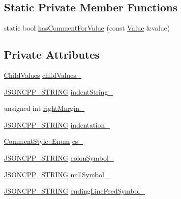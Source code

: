 \subsection*{Static Private Member Functions}
\begin{DoxyCompactItemize}
\item 
static bool \hyperlink{struct_json_1_1_built_styled_stream_writer_a457c2f3c1e8c952caeb60e52477d0c9a}{has\+Comment\+For\+Value} (const \hyperlink{class_json_1_1_value}{Value} \&value)
\end{DoxyCompactItemize}
\subsection*{Private Attributes}
\begin{DoxyCompactItemize}
\item 
\hyperlink{struct_json_1_1_built_styled_stream_writer_a63196b38400e5ce452f65ce856d47b6f}{Child\+Values} \hyperlink{struct_json_1_1_built_styled_stream_writer_a47d562d7874c5b1e68995bd62f575792}{child\+Values\+\_\+}
\item 
\hyperlink{config_8h_a1e723f95759de062585bc4a8fd3fa4be}{J\+S\+O\+N\+C\+P\+P\+\_\+\+S\+T\+R\+I\+NG} \hyperlink{struct_json_1_1_built_styled_stream_writer_a0f8115a4fb474ab0e9de25f10e5ca09a}{indent\+String\+\_\+}
\item 
unsigned int \hyperlink{struct_json_1_1_built_styled_stream_writer_a06a51521ccae20397f52fe3036edc602}{right\+Margin\+\_\+}
\item 
\hyperlink{config_8h_a1e723f95759de062585bc4a8fd3fa4be}{J\+S\+O\+N\+C\+P\+P\+\_\+\+S\+T\+R\+I\+NG} \hyperlink{struct_json_1_1_built_styled_stream_writer_aaa4cbad91428ceca37cbabfc2a17a92d}{indentation\+\_\+}
\item 
\hyperlink{struct_json_1_1_comment_style_a51fc08f3518fd81eba12f340d19a3d0c}{Comment\+Style\+::\+Enum} \hyperlink{struct_json_1_1_built_styled_stream_writer_a89a9c76c7531143b52785861ba21c1d4}{cs\+\_\+}
\item 
\hyperlink{config_8h_a1e723f95759de062585bc4a8fd3fa4be}{J\+S\+O\+N\+C\+P\+P\+\_\+\+S\+T\+R\+I\+NG} \hyperlink{struct_json_1_1_built_styled_stream_writer_a9f10991ddef9b77d0b580e24e71483c6}{colon\+Symbol\+\_\+}
\item 
\hyperlink{config_8h_a1e723f95759de062585bc4a8fd3fa4be}{J\+S\+O\+N\+C\+P\+P\+\_\+\+S\+T\+R\+I\+NG} \hyperlink{struct_json_1_1_built_styled_stream_writer_a6ccceadf4b1286a519a175cb59cb61d5}{null\+Symbol\+\_\+}
\item 
\hyperlink{config_8h_a1e723f95759de062585bc4a8fd3fa4be}{J\+S\+O\+N\+C\+P\+P\+\_\+\+S\+T\+R\+I\+NG} \hyperlink{struct_json_1_1_built_styled_stream_writer_a5e61a9a4b2af52b98900286c843b86f7}{ending\+Line\+Feed\+Symbol\+\_\+}

\end{DoxyCompactItemize}
